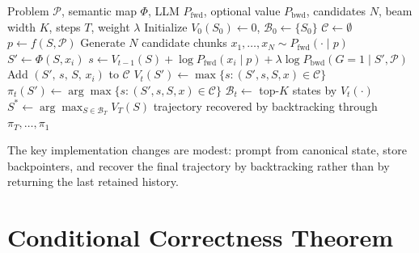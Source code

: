 \documentclass[11pt,letterpaper]{article}
\newcommand{\Phifn}{\Phi}
\newcommand{\Pfwd}{P_{\mathrm{fwd}}}
\newcommand{\Pbwd}{P_{\mathrm{bwd}}}
\newcommand{\calP}{\mathcal{P}}
\newcommand{\SAVI}{\textsc{savi}\xspace}
\begin{document}
\begin{algorithm}[H]
\caption{Canonical \SAVI as Conditional Viterbi DP}
\label{alg:canonical-savi}
\begin{algorithmic}[1]
  \Require Problem $\calP$, semantic map $\Phifn$, LLM $\Pfwd$, optional value $\Pbwd$,
           candidates $N$, beam width $K$, steps $T$, weight $\lambda$
  \State Initialize $V_0(S_0) \leftarrow 0$, $\mathcal{B}_0 \leftarrow \{S_0\}$
    \State $\mathcal{C} \leftarrow \emptyset$
      \State $p \leftarrow f(S, \calP)$  
      \State Generate $N$ candidate chunks $x_1, \ldots, x_N \sim \Pfwd(\cdot \mid p)$
        \State $S' \leftarrow \Phifn(S, x_i)$
          \State $s \leftarrow V_{t-1}(S) + \log \Pfwd(x_i \mid p)
                   + \lambda \log \Pbwd(G{=}1 \mid S', \calP)$
          \State Add $(S',\, s,\, S,\, x_i)$ to $\mathcal{C}$
        \EndIf
      \EndFor
    \EndFor
      \State $V_t(S') \leftarrow \max\{s : (S', s, S, x) \in \mathcal{C}\}$
      \State $\pi_t(S') \leftarrow \arg\max\{s : (S', s, S, x) \in \mathcal{C}\}$
    \EndFor
    \State $\mathcal{B}_t \leftarrow$ top-$K$ states by $V_t(\cdot)$
  \EndFor
  \State $S^* \leftarrow \arg\max_{S \in \mathcal{B}_T} V_T(S)$
  \State \Return trajectory recovered by backtracking through $\pi_T, \ldots, \pi_1$
\end{algorithmic}
\end{algorithm}

The key implementation changes are modest: prompt from canonical state, store backpointers, and
recover the final trajectory by backtracking rather than by returning the last retained history.

\section{Conditional Correctness Theorem}
\end{document}
